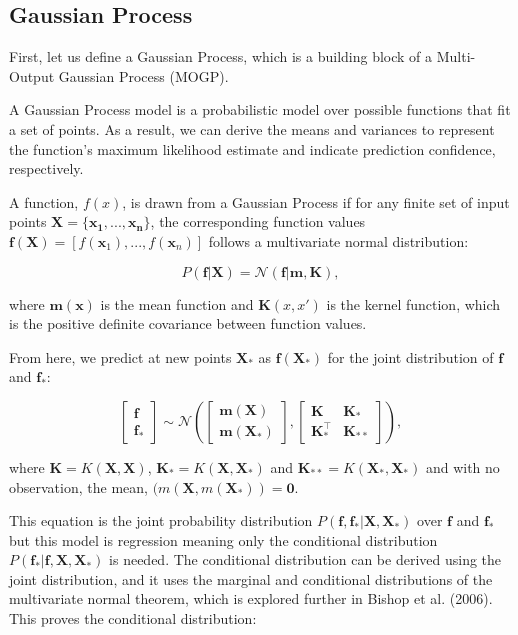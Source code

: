 \subsection{Gaussian Process}
First, let us define a Gaussian Process, which is a building block of a Multi-Output Gaussian Process (MOGP).

A Gaussian Process model is a probabilistic model over possible functions that fit a set of points.\cite{10360364} As a result, we can derive the means and variances to represent the function's maximum likelihood estimate and indicate prediction confidence, respectively.\cite{10360364}

A function, $f(x)$, is drawn from a Gaussian Process if for any finite set of input points $\mathbf{X} = \{\mathbf{x_1},...,\mathbf{x_n}\}$, the corresponding function values $\boldsymbol{f}(\mathbf{X}) = [f(\mathbf{x}_1),...,f(\mathbf{x}_n)]$ follows a multivariate normal distribution:

\[P(\boldsymbol{f}|\mathbf{X}) = \mathcal{N}(\boldsymbol{f}|\mathbf{m},\mathbf{K}),\]

\noindent where $\mathbf{m}(\mathbf{x})$ is the mean function and $\mathbf{K}(x,x')$ is the kernel function, which is the positive definite covariance between function values.\cite{10360364}

\noindent From here, we predict at new points $\mathbf{X_*}$ as $\boldsymbol{f(X_*)}$ for the joint distribution of $\boldsymbol{f}$ and $\boldsymbol{f_*}$:

\[
\begin{bmatrix} \boldsymbol{f} \\ \boldsymbol{f}_* \end{bmatrix} \sim \mathcal{N}
\left(
\begin{bmatrix} \mathbf{m}(\mathbf{X}) \\ \mathbf{m}(\mathbf{X}_*) \end{bmatrix},
\begin{bmatrix} \mathbf{K} & \mathbf{K}_* \\ \mathbf{K}_*^\top & \mathbf{K}_{**} \end{bmatrix}
\right),
\]

\noindent where $\mathbf{K} = K(\mathbf{X},\mathbf{X})$, $\mathbf{K_*} = K(\mathbf{X},\mathbf{X_*})$ and 
$\mathbf{K_{**}} = K(\mathbf{X_*},\mathbf{X_*})$ and with no observation, the mean, $(m(\mathbf{X},m(\mathbf{X_*}))=\mathbf{0}$.\cite{10360364}

This equation is the joint probability distribution $P(\boldsymbol{f}, \boldsymbol{f_*}|\mathbf{X},\mathbf{X_*})$ over $\boldsymbol{f}$ and $\boldsymbol{f_*}$ but this model is regression meaning only the conditional distribution $P(\boldsymbol{f_*}| \boldsymbol{f},\mathbf{X},\mathbf{X_*})$ is needed.\cite{10360364} The conditional distribution can be derived using the joint distribution, and it uses the marginal and conditional distributions of the multivariate normal theorem, which is explored further in Bishop et al. (2006). This proves the conditional distribution:

